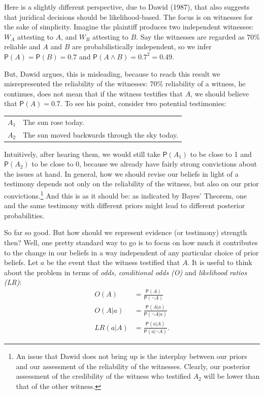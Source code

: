 \documentclass[10pt,dvipsnames,enabledeprecatedfontcommands]{scrartcl}
\newcommand{\n}{\neg}
\newcommand{\et}{\wedge}
\newcommand{\pr}[1]{\mathsf{P}(#1)}
\begin{document}
Here is a slightly different perspective, due to Dawid (1987), that also
suggests that juridical decisions should be likelihood-based. The focus
is on witnesses for the sake of simplicity. Imagine the plaintiff
produces two independent witnesses: \(W_A\) attesting to \(A\), and
\(W_B\) attesting to \(B\). Say the witnesses are regarded as \(70\%\)
reliable and \(A\) and \(B\) are probabilistically independent, so we
infer \(\pr{A}=\pr{B}=0.7\) and \(\pr{A\et B}=0.7^2=0.49\).

But, Dawid argues, this is misleading, because to reach this result we
misrepresented the reliability of the witnesses: \(70\%\) reliability of
a witness, he continues, does not mean that if the witness testifies
that \(A\), we should believe that \(\pr{A}=0.7\). To see his point,
consider two potential testimonies:

\begin{center}
\begin{tabular}
{@{}ll@{}}
\toprule
  $A_1$ & The sun rose today. \\
   $A_2$ & The sun moved backwards through the sky today.\\
\bottomrule
\end{tabular}
\end{center}

\noindent     Intuitively, after hearing them, we would still take
\(\pr{A_1}\) to be close to 1 and \(\pr{A_2}\) to be close to 0, because
we already have fairly strong convictions about the issues at hand. In
general, how we should revise our beliefs in light of a testimony
depends not only on the reliability of the witness, but also on our
prior
convictions.\footnote{An issue that Dawid does not bring up is the interplay between our priors and our assessment of the reliability of the witnesses. Clearly, our posterior assessment of the credibility of the witness who testified $A_2$ will be lower than that of the other witness.}
And this is as it should be: as indicated by Bayes' Theorem, one and the
same testimony with different priors might lead to different posterior
probabilities.

So far so good. But how should we represent evidence (or testimony)
strength then? Well, one pretty standard way to go is to focus on how
much it contributes to the change in our beliefs in a way independent of
any particular choice of prior beliefs. Let \(a\) be the event that the
witness testified that \(A\). It is useful to think about the problem in
terms of \emph{odds, conditional odds (O)} and
\emph{likelihood ratios (LR)}:
\begin{align*} O(A)  & = \frac{\pr{A}}{\pr{\n A}}\\
 O(A\vert a) &= \frac{\pr{A\vert a}}{\pr{\n A \vert a}}  \\
 LR(a\vert A) &= \frac{\pr{a\vert A}}{\pr{a\vert \n A}}. 
\end{align*}
\end{document}
